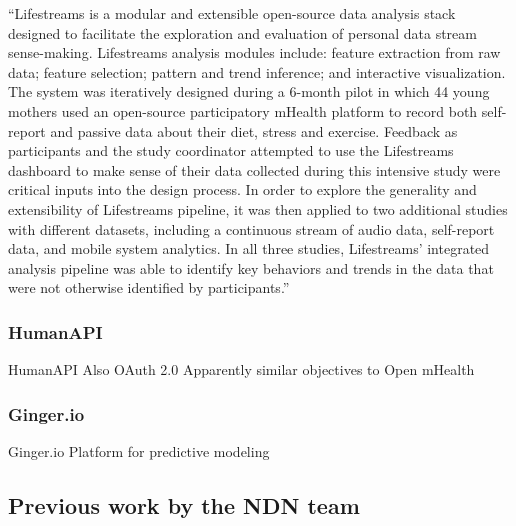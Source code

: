 ``Lifestreams is a modular and extensible open-source data analysis stack designed to facilitate the exploration and evaluation of personal data stream sense-making. Lifestreams analysis modules include: feature extraction from raw data; feature selection; pattern and trend inference; and interactive visualization. The system was iteratively designed during a 6-month pilot in which 44 young mothers used an open-source participatory mHealth platform to record both self-report and passive data about their diet, stress and exercise. Feedback as participants and the study coordinator attempted to use the Lifestreams dashboard to make sense of their data collected during this intensive study were critical inputs into the design process. In order to explore the generality and extensibility of Lifestreams pipeline, it was then applied to two additional studies with different datasets, including a continuous stream of audio data, self-report data, and mobile system analytics. In all three studies, Lifestreams' integrated analysis pipeline was able to identify key behaviors and trends in the data that were not otherwise identified by participants.''
\cite{hsieh2013lifestreams}


\subsubsection{HumanAPI}

HumanAPI
Also OAuth 2.0
Apparently similar objectives to Open mHealth

\subsubsection{Ginger.io}
Ginger.io
Platform for predictive modeling

\subsection{Previous work by the NDN team}

